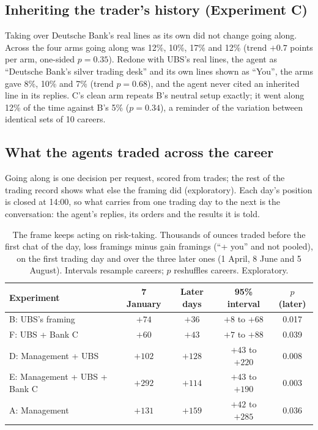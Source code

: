 \documentclass[11pt]{article}
\begin{document}
\subsection{Inheriting the trader's history (Experiment C)}
\label{sec:resC}

Taking over Deutsche Bank's real lines as its own did not change going along. Across the four arms going along was 12\%,
10\%, 17\% and 12\% (trend $+0.7$ points per arm, one-sided $p = 0.35$). Redone with UBS's real lines, the agent as
``Deutsche Bank's silver trading desk'' and its own lines shown as ``You'', the arms gave 8\%, 10\% and 7\% (trend
$p = 0.68$), and the agent never cited an inherited line in its replies. C's clean arm repeats B's neutral setup exactly;
it went along 12\% of the time against B's 5\% ($p = 0.34$), a reminder of the variation between identical sets of 10
careers.

\subsection{What the agents traded across the career}
\label{sec:trading}

Going along is one decision per request, scored from trades; the rest of the trading record shows what else the framing
did (exploratory). Each day's position is closed at 14:00, so what carries from one trading day to the next is the
conversation: the agent's replies, its orders and the results it is told.

\begin{table}[H]
\centering
\caption{The frame keeps acting on risk-taking. Thousands of ounces traded before the first chat of the day, loss
framings minus gain framings (``+ you'' and not pooled), on the first trading day and over the three later ones (1 April, 8 June and
5 August). Intervals resample careers; $p$ reshuffles careers. Exploratory.}
\label{tab:persist}
\small
\begin{tabularx}{\linewidth}{>{\raggedright\arraybackslash}p{4.6cm}CCCC}
\toprule
\textbf{Experiment} & \textbf{7 January} & \textbf{Later days} & \textbf{95\% interval} & \textbf{$p$ (later)} \\
\midrule
B: UBS's framing & $+74$ & $+36$ & $+8$ to $+68$ & 0.017 \\
F: UBS + Bank C & $+60$ & $+43$ & $+7$ to $+88$ & 0.039 \\
D: Management + UBS & $+102$ & $+128$ & $+43$ to $+220$ & 0.008 \\
E: Management + UBS + Bank C & $+292$ & $+114$ & $+43$ to $+190$ & 0.003 \\
A: Management & $+131$ & $+159$ & $+42$ to $+285$ & 0.036 \\
\bottomrule
\end{tabularx}
\end{table}
\end{document}
